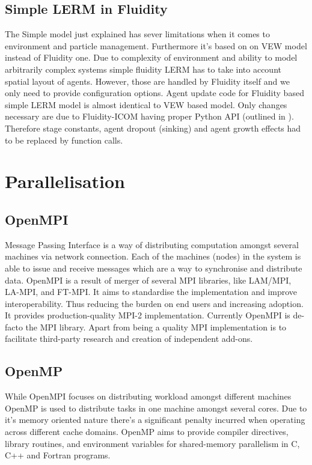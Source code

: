 \documentclass[12pt, a4paper]{report}
\begin{document}
\subsection{Simple LERM in Fluidity}\label{subsec:lerm-simp-fluid}
The Simple model just explained has sever limitations when it comes
to environment and particle management. Furthermore it's based on
on VEW model instead of Fluidity one. Due to complexity of environment
and ability to model arbitrarily complex systems simple fluidity
LERM has to take into account spatial layout of agents. However,
those are handled by Fluidity itself and we only need to provide
configuration options. Agent update code for Fluidity based simple
LERM model is almost identical to VEW based model. Only changes
necessary are due to Fluidity-ICOM having proper Python API (outlined
in \cite{FluidityVEW}). Therefore stage constants, agent dropout (sinking)
and agent growth effects had to be replaced by function calls.


\section{Parallelisation}\label{sec:para}

\subsection{OpenMPI}\label{subsec:openmpi}
Message Passing Interface is a way of distributing computation
amongst several machines via network connection. Each of the
machines (nodes) in the system is able to issue and receive
messages which are a way to synchronise and distribute data.
OpenMPI \cite{gabriel04:_open_mpi} is a result of merger of several MPI libraries, like
LAM/MPI, LA-MPI, and FT-MPI. It aims to standardise the implementation
and improve interoperability. Thus reducing the burden on
end users and increasing adoption. It provides production-quality
MPI-2 implementation. Currently OpenMPI is de-facto the MPI
library. Apart from being a quality MPI implementation is to
facilitate third-party research and creation of independent
add-ons.

\subsection{OpenMP}\label{subsec:openmp}
While OpenMPI focuses on distributing workload amongst different
machines OpenMP \cite{OpenMP4.0} is used to distribute tasks in one machine amongst
several cores. Due to it's memory oriented nature there's a significant
penalty incurred when operating across different cache domains.
OpenMP aims to provide compiler directives, library routines, and environment variables
for shared-memory parallelism in C, C++ and Fortran programs.
\end{document}
